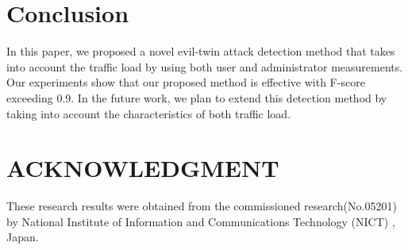 \documentclass[conference]{IEEEtran}
\begin{document}
\begin{comment}
\begin{figure}[htbp]
  \begin{minipage}[htbp]{0.45\linewidth}
    \centering
    \texttt{[image: non-iperf.eps]}
    \caption{RTT without iperf}
  \end{minipage}
  \begin{minipage}[htbp]{0.45\linewidth}
    \centering
    \texttt{[image: iperf-3MB.eps]}
    \caption{RTT for 3MB load with iperf}
  \end{minipage}
\end{figure}

\begin{figure}[htbp]
  \begin{minipage}[htbp]{0.45\linewidth}
    \centering
    \texttt{[image: iperf-5MB.eps]}
    \caption{RTT for 5MB load with iperf}
  \end{minipage}
  \begin{minipage}[htbp]{0.45\linewidth}
    \centering
    \texttt{[image: iperf-7MB.eps]}
    \caption{RTT for 7MB load with iperf}
  \end{minipage}
\end{figure}
\end{comment}



\section{Conclusion}
In this paper, we proposed a novel evil-twin attack detection method that takes into account the traffic load by using both user and administrator measurements. Our experiments show that our proposed method is effective with F-score exceeding 0.9. In the future work, we plan to extend this detection method by taking into account the characteristics of both traffic load.


\section*{ACKNOWLEDGMENT}
These research results were obtained from the commissioned research(No.05201) by National Institute of Information and Communications Technology (NICT) , Japan.
\end{document}
